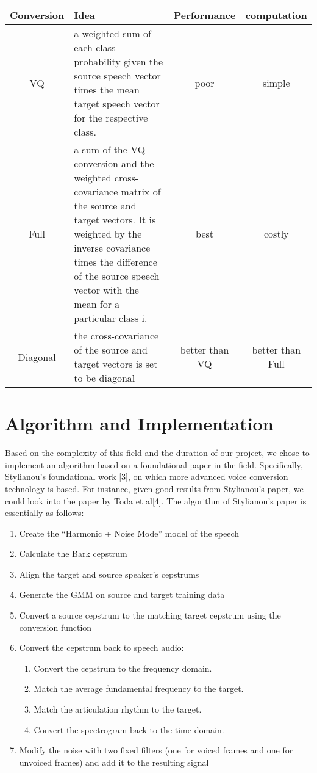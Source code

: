 \documentclass{article}
\begin{document}
\begin{center}
    \begin{tabular}{ | c | p{6.5cm}  | c | c |}
    \hline
    Conversion & Idea & Performance & computation\\ \hline
    VQ & a weighted sum of each class probability given the source speech vector times the mean target speech vector for the respective class. & poor & simple\\ \hline
    Full & a sum of the VQ conversion and the weighted cross-covariance matrix of the source and target vectors. It is weighted by the inverse covariance times the difference of the source speech vector with the mean for a particular class i. & best & costly\\ \hline
    Diagonal & the cross-covariance of the source and target vectors is set to be diagonal & better than VQ & better than Full\\ \hline
    \end{tabular}
\end{center}   

\section{Algorithm and Implementation}

Based on the complexity of this field and the duration of our project, we chose to implement an algorithm based on a foundational paper in the field. Specifically, Stylianou's foundational work [3], on which more advanced voice conversion technology is based. For instance, given good results from Stylianou's paper, we could look into the paper by Toda et al[4]. The algorithm of Stylianou's paper is essentially as follows:
\begin{enumerate}
\item Create the ``Harmonic + Noise Mode'' model of the speech

\item Calculate the Bark cepstrum

\item Align the target and source speaker's cepstrums

\item Generate the GMM on source and target training data

\item Convert a source cepstrum to the matching target cepstrum using the conversion function
\item Convert the cepstrum back to speech audio:
\begin{enumerate}
\item Convert the cepstrum to the frequency domain.
\item Match the average fundamental frequency to the target.
\item Match the articulation rhythm to the target.
\item Convert the spectrogram back to the time domain.
\end{enumerate}

\item Modify the noise with two fixed filters (one for voiced frames and one for unvoiced frames) and add it to the resulting signal
\end{enumerate}
\end{document}
